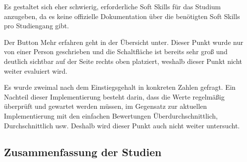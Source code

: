 Es gestaltet sich eher schwierig, erforderliche Soft Skills für das Studium anzugeben, da es keine offizielle Dokumentation über die benötigten Soft Skills pro Studiengang gibt.

Der Button \glqq Mehr erfahren\grqq{} geht in der Übersicht unter. Dieser Punkt wurde nur von einer Person geschrieben und die Schaltfläche ist bereits sehr groß und deutlich sichtbar auf der Seite rechts oben platziert, weshalb dieser Punkt nicht weiter evaluiert wird.

Es wurde zweimal nach dem Einstiegsgehalt in konkreten Zahlen gefragt. Ein Nachteil dieser Implementierung besteht darin, dass die Werte regelmäßig überprüft und gewartet werden müssen, im Gegensatz zur aktuellen Implementierung mit den einfachen Bewertungen \glqq Überdurchschnittlich\grqq{}, \glqq Durchschnittlich\grqq{} usw. Deshalb wird dieser Punkt auch nicht weiter untersucht.



\subsection{Zusammenfassung der Studien}